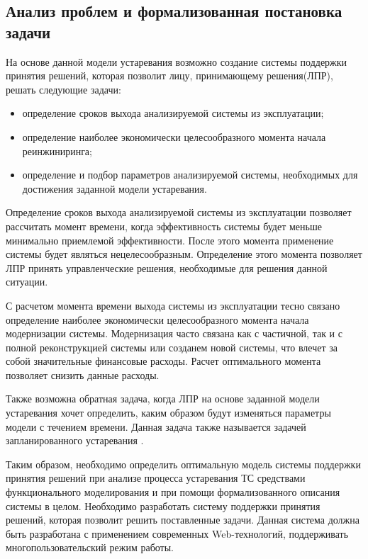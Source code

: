 \subsection{Анализ проблем и формализованная постановка задачи}
На основе данной модели устаревания возможно создание системы поддержки принятия решений, которая позволит лицу, принимающему решения(ЛПР), решать следующие задачи:
\begin{itemize}
    \item определение сроков выхода анализируемой системы из эксплуатации;
    \item определение наиболее экономически целесообразного момента начала реинжиниринга;
    \item определение и подбор параметров анализируемой системы, необходимых для достижения заданной модели устаревания.
\end{itemize}

Определение сроков выхода анализируемой системы из эксплуатации позволяет рассчитать момент времени, когда эффективность системы будет меньше минимально приемлемой эффективности. 
После этого момента применение системы будет являться нецелесообразным. Определение этого момента позволяет ЛПР принять управленческие решения, необходимые для решения данной ситуации.

С расчетом момента времени выхода системы из эксплуатации тесно связано определение наиболее экономически целесообразного момента начала модернизации системы. 
Модернизация часто связана как с частичной, так и с полной реконструкцией системы или созданем новой системы, что влечет за собой значительные финансовые расходы. 
Расчет оптимального момента позволяет снизить данные расходы.

Также возможна обратная задача, когда ЛПР на основе заданной модели устаревания хочет определить, каким образом будут изменяться параметры модели с течением времени. 
Данная задача также называется задачей запланированного устаревания \cite{Serpokrylov}.

Таким образом, необходимо определить оптимальную модель системы поддержки принятия решений при анализе процесса устаревания ТС средствами функционального моделирования и при помощи формализованного описания системы в целом. 
Необходимо разработать систему поддержки принятия решений, которая позволит решить поставленные задачи. 
Данная система должна быть разработана с применением современных Web-технологий, поддерживать многопользовательский режим работы.

